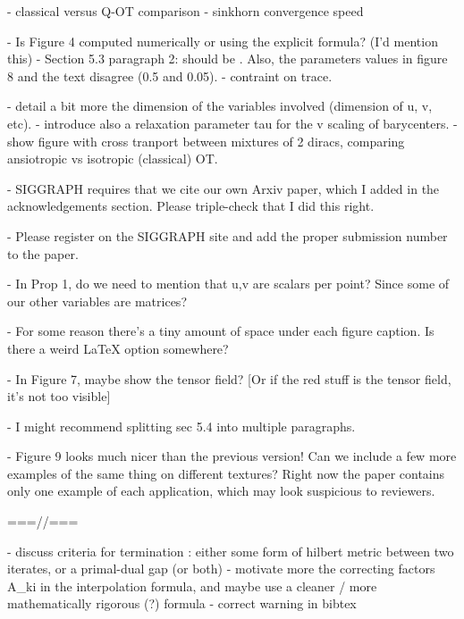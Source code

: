 - classical versus Q-OT comparison
- sinkhorn convergence speed

- Is Figure 4 computed numerically or using the explicit formula? (I'd mention this)
- Section 5.3 paragraph 2: \tau should be \rho. Also, the parameters values in figure 8 and the text disagree (0.5 and 0.05).
- contraint on trace.


- detail a bit more the dimension of the variables involved (dimension of u, v, etc).
- introduce also a relaxation parameter tau for the v scaling of barycenters.
- show figure with cross tranport between mixtures of 2 diracs, comparing ansiotropic vs isotropic (classical) OT. 


- SIGGRAPH requires that we cite our own Arxiv paper, which I added in the acknowledgements section.  Please triple-check that I did this right.

- Please register on the SIGGRAPH site and add the proper submission number to the paper.

- In Prop 1, do we need to mention that u,v are scalars per point?  Since some of our other variables are matrices?

- For some reason there's a tiny amount of space under each figure caption.  Is there a weird LaTeX option somewhere?

- In Figure 7, maybe show the tensor field?  [Or if the red stuff is the tensor field, it's not too visible]

- I might recommend splitting sec 5.4 into multiple paragraphs.

- Figure 9 looks much nicer than the previous version!  Can we include a few more examples of the same thing on different textures?  Right now the paper contains only one example of each application, which may look suspicious to reviewers.


===//===

- discuss criteria for termination : either some form of hilbert metric between two iterates, or a primal-dual gap (or both)
- motivate more the correcting factors A_ki in the interpolation formula, and maybe use a cleaner / more mathematically rigorous (?) formula 
- correct warning in bibtex